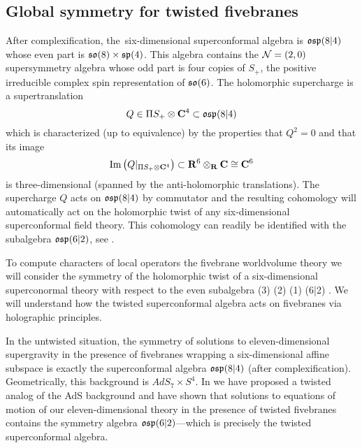 \documentclass[11pt]{amsart}
\begin{document}
\subsection{Global symmetry for twisted fivebranes}

% 

After complexification, the~six-dimensional superconformal algebra is $\mathfrak{osp}(8|4)$ whose even part is $\mathfrak{so}(8) \times \mathfrak{sp}(4)$. 
This algebra contains the $\mathcal N=(2,0)$ supersymmetry algebra whose odd part is four copies of $S_+$, the positive irreducible complex spin representation of $\mathfrak{so}(6)$.
The holomorphic supercharge is a supertranslation 
\[
Q \in \Pi S_+ \otimes \mathbf{C}^4 \subset \mathfrak{osp}(8|4)
\]
which is characterized (up to equivalence) by the properties that $Q^2 = 0$ and that its image
\[
{\rm Im}\left(Q|_{\Pi S_+ \otimes \mathbf{C}^4} \right) \subset \mathbf{R}^6 \otimes_{\mathbf{R}} \mathbf{C} \cong \mathbf{C}^6
\]
is three-dimensional (spanned by the anti-holomorphic translations). 
The supercharge $Q$ acts on $\mathfrak{osp}(8|4)$ by commutator and the resulting cohomology will automatically act on the holomorphic twist of any six-dimensional superconformal field theory. 
This cohomology can readily be identified with the subalgebra $\mathfrak{osp}(6|2)$, see \cite{SWe36}. 

To compute characters of local operators the fivebrane worldvolume theory we will consider the symmetry of the holomorphic twist of a six-dimensional superconormal theory with respect to the even subalgebra 
\beqn\label{eqn:bosonic1}
(3) \times {}(2) \times {}(1) \subset {}(6|2) .
\eeqn
We will understand how the twisted superconformal algebra acts on fivebranes via holographic principles.

In the untwisted situation, the symmetry of solutions to eleven-dimensional supergravity in the presence of fivebranes wrapping a six-dimensional affine subspace is exactly the superconformal algebra $\mathfrak{osp}(8|4)$ (after complexification). 
Geometrically, this background is $AdS_7 \times S^4$. 
In \cite{RSW} we have proposed a twisted analog of the AdS background and have shown that solutions to equations of motion of our eleven-dimensional theory in the presence of twisted fivebranes contains the symmetry algebra $\mathfrak{osp}(6|2)$---which is precisely the twisted superconformal algebra.
\end{document}
